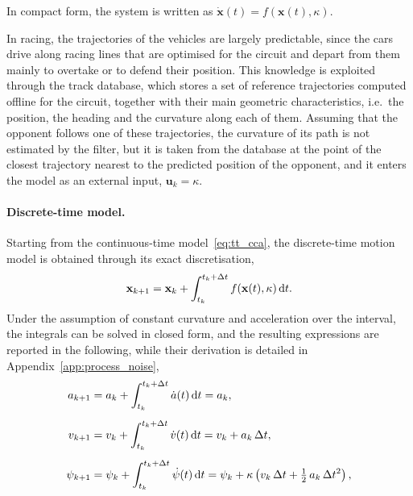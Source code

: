 In compact form,
the system is written as $\dot{\mathbf{x}}(t) = f(\mathbf{x}(t),\kappa)$.

In racing, the trajectories of the vehicles are largely predictable, since the cars drive along
racing lines that are optimised for the circuit and depart from them mainly to overtake or to
defend their position. This knowledge is exploited through the track database, which stores a set of reference trajectories computed offline for
the circuit, together with their main geometric characteristics, i.e.\ the position, the
heading and the curvature along each of them. Assuming that the opponent follows one of these
trajectories, the curvature of its path is not estimated by the filter, but it is taken from the
database at the point of the closest trajectory nearest to the predicted position of the
opponent, and it enters the model as an external input, $\mathbf{u}_k = \kappa$.

\paragraph{Discrete-time model.} Starting from the continuous-time
model~\eqref{eq:tt_cca}, the discrete-time motion model is obtained through its exact
discretisation,
\begin{equation}
    \renewcommand{\arraystretch}{1.3}\setlength{\jot}{8pt}
    \mathbf{x}_{k+1} = \mathbf{x}_k
    + \int_{t_k}^{t_k+\Delta t} f(\mathbf{x}(t),\kappa)\,\mathrm{d}t.
    \label{eq:tt_exact_disc}
\end{equation}
Under the assumption of constant curvature and acceleration over the interval, the integrals
can be solved in closed form, and the resulting expressions are reported in the following,
while their derivation is detailed in Appendix~\ref{app:process_noise},
\begin{equation}
    \renewcommand{\arraystretch}{1.3}\setlength{\jot}{8pt}
    \begin{aligned}
        a_{k+1}    &= a_k + \int_{t_k}^{t_k+\Delta t} \dot a(t)\,\mathrm{d}t = a_k, \\
        v_{k+1}    &= v_k + \int_{t_k}^{t_k+\Delta t} \dot v(t)\,\mathrm{d}t = v_k + a_k\,\Delta t, \\
        \psi_{k+1} &= \psi_k + \int_{t_k}^{t_k+\Delta t} \dot\psi(t)\,\mathrm{d}t
                    = \psi_k + \kappa\left(v_k\,\Delta t + \tfrac{1}{2}\,a_k\,\Delta t^2\right),
    \end{aligned}
    \label{eq:tt_cca_vapsi}
\end{equation}

